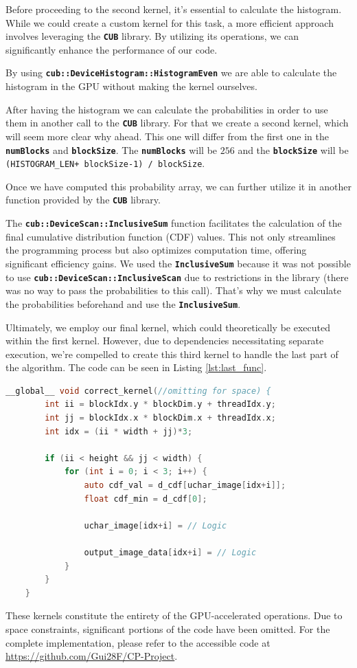 \documentclass[sigconf]{acmart}
\begin{document}
Before proceeding to the second kernel, it's essential to calculate the histogram. While we could create a custom kernel for this task, a more efficient approach involves leveraging the \texttt{\textbf{CUB}} library. By utilizing its operations, we can significantly enhance the performance of our code.

By using \texttt{\textbf{cub::DeviceHistogram::HistogramEven}} we are able to calculate the histogram in the GPU without making the kernel ourselves.

After having the histogram we can calculate the probabilities in order to use them in another call to the \texttt{\textbf{CUB}} library. For that we create a second kernel, which will seem more clear why ahead. This one will differ from the first one in the \texttt{\textbf{numBlocks}} and \texttt{\textbf{blockSize}}. The \texttt{\textbf{numBlocks}} will be $256$ and the \texttt{\textbf{blockSize}} will be \texttt{(HISTOGRAM\_LEN+ blockSize-1) / blockSize}.

Once we have computed this probability array, we can further utilize it in another function provided by the \texttt{\textbf{CUB}}  library.

The \texttt{\textbf{cub::DeviceScan::InclusiveSum}} function facilitates the calculation of the final cumulative distribution function (CDF) values. This not only streamlines the programming process but also optimizes computation time, offering significant efficiency gains. We used the \texttt{\textbf{InclusiveSum}} because it was not possible to use \texttt{\textbf{cub::DeviceScan::InclusiveScan}} due to restrictions in the library (there was no way to pass the probabilities to this call). That's why we must calculate the probabilities beforehand and use the \texttt{\textbf{InclusiveSum}}.

Ultimately, we employ our final kernel, which could theoretically be executed within the first kernel. However, due to dependencies necessitating separate execution, we're compelled to create this third kernel to handle the last part of the algorithm. The code can be seen in Listing \ref{lst:last_func}.

\begin{lstlisting}[language=C, caption=Correct and Rescale, label={lst:last_func}]
 __global__ void correct_kernel(//omitting for space) {
        int ii = blockIdx.y * blockDim.y + threadIdx.y;
        int jj = blockIdx.x * blockDim.x + threadIdx.x;
        int idx = (ii * width + jj)*3;

        if (ii < height && jj < width) {
            for (int i = 0; i < 3; i++) {
                auto cdf_val = d_cdf[uchar_image[idx+i]];
                float cdf_min = d_cdf[0];
                
                uchar_image[idx+i] = // Logic

                output_image_data[idx+i] = // Logic
            }
        }
    }
\end{lstlisting}
These kernels constitute the entirety of the GPU-accelerated operations. Due to space constraints, significant portions of the code have been omitted. For the complete implementation, please refer to the accessible code at \url{https://github.com/Gui28F/CP-Project}. 
\end{document}
